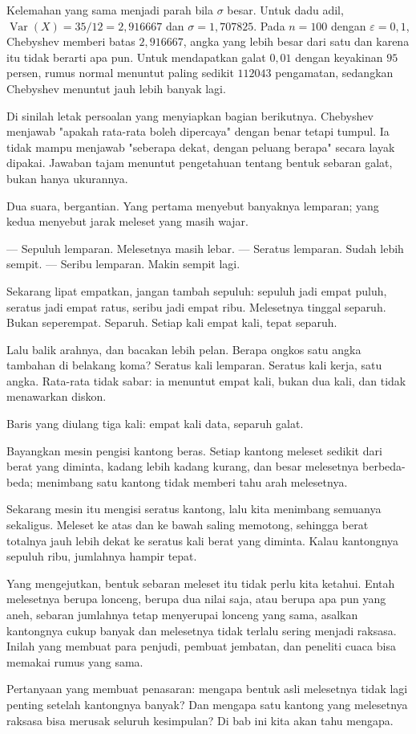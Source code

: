Kelemahan yang sama menjadi parah bila $\sigma$ besar. Untuk dadu adil,
$\operatorname{Var}(X)=35/12=2{,}916667$ dan $\sigma=1{,}707825$. Pada $n=100$
dengan $\varepsilon=0{,}1$, Chebyshev memberi batas $2{,}916667$, angka yang lebih
besar dari satu dan karena itu tidak berarti apa pun. Untuk mendapatkan galat
$0{,}01$ dengan keyakinan $95$ persen, rumus normal menuntut paling sedikit
$112043$ pengamatan, sedangkan Chebyshev menuntut jauh lebih banyak lagi.

Di sinilah letak persoalan yang menyiapkan bagian berikutnya. Chebyshev menjawab
"apakah rata-rata boleh dipercaya" dengan benar tetapi tumpul. Ia tidak mampu
menjawab "seberapa dekat, dengan peluang berapa" secara layak dipakai. Jawaban
tajam menuntut pengetahuan tentang bentuk sebaran galat, bukan hanya ukurannya.

\begin{bacakeras}
Dua suara, bergantian. Yang pertama menyebut banyaknya lemparan; yang kedua
menyebut jarak meleset yang masih wajar.

--- Sepuluh lemparan. Melesetnya masih lebar.
--- Seratus lemparan. Sudah lebih sempit.
--- Seribu lemparan. Makin sempit lagi.

Sekarang lipat empatkan, jangan tambah sepuluh: sepuluh jadi empat puluh,
seratus jadi empat ratus, seribu jadi empat ribu. Melesetnya tinggal separuh.
Bukan seperempat. Separuh. Setiap kali empat kali, tepat separuh.

Lalu balik arahnya, dan bacakan lebih pelan. Berapa ongkos satu angka tambahan
di belakang koma? Seratus kali lemparan. Seratus kali kerja, satu angka.
Rata-rata tidak sabar: ia menuntut empat kali, bukan dua kali, dan tidak
menawarkan diskon.

Baris yang diulang tiga kali: empat kali data, separuh galat.
\end{bacakeras}

\begin{untukanak}
Bayangkan mesin pengisi kantong beras. Setiap kantong meleset sedikit dari berat
yang diminta, kadang lebih kadang kurang, dan besar melesetnya berbeda-beda;
menimbang satu kantong tidak memberi tahu arah melesetnya.

Sekarang mesin itu mengisi seratus kantong, lalu kita menimbang semuanya
sekaligus. Meleset ke atas dan ke bawah saling memotong, sehingga berat totalnya
jauh lebih dekat ke seratus kali berat yang diminta. Kalau kantongnya sepuluh
ribu, jumlahnya hampir tepat.

Yang mengejutkan, bentuk sebaran meleset itu tidak perlu kita ketahui. Entah
melesetnya berupa lonceng, berupa dua nilai saja, atau berupa apa pun yang aneh,
sebaran jumlahnya tetap menyerupai lonceng yang sama, asalkan kantongnya cukup
banyak dan melesetnya tidak terlalu sering menjadi raksasa. Inilah yang membuat
para penjudi, pembuat jembatan, dan peneliti cuaca bisa memakai rumus yang sama.

Pertanyaan yang membuat penasaran: mengapa bentuk asli melesetnya tidak lagi
penting setelah kantongnya banyak? Dan mengapa satu kantong yang melesetnya
raksasa bisa merusak seluruh kesimpulan? Di bab ini kita akan tahu mengapa.
\end{untukanak}

